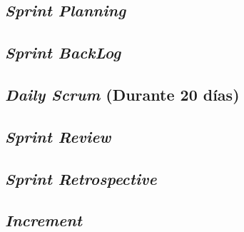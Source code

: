 \begin{spacing}{1.5}
	\subsection{\textit{Sprint Planning}}
	\subsection{\textit{Sprint BackLog}}
	\subsection{\textit{Daily Scrum} (Durante 20 d\'{i}as)}
	\subsection{\textit{Sprint Review}}
	\subsection{\textit{Sprint Retrospective}}
	
	\subsection{\textit{Increment}}
\end{spacing}